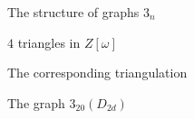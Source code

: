 \documentclass[%
pdf,
colorBG,
slideColor,
]{prosper}
\begin{document}
\begin{slide}{The structure of graphs $3_n$}

\vspace{-4mm}
\begin{center}
\begin{minipage}{5cm}
\par
$4$ triangles in $Z[\omega]$
\end{minipage}
\begin{minipage}{5cm}
\par
The corresponding triangulation
\end{minipage}
\end{center}

\begin{center}
\begin{minipage}{5cm}
\par
\end{minipage}
\begin{minipage}{5cm}
The graph $3_{20}(D_{2d})$
\end{minipage}
\end{center}

\end{slide}
\end{document}
